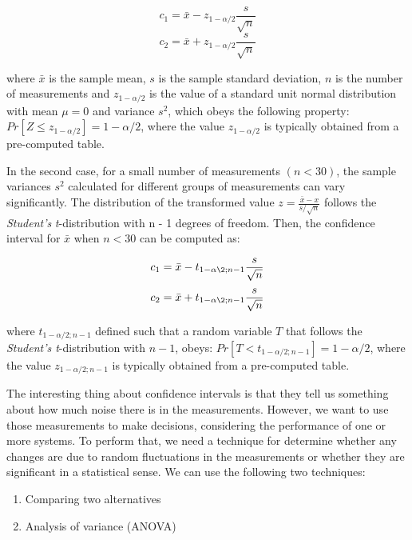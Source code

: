 \documentclass{latex/classes/thesis}
\begin{document}
\begin{equation}
c_1 = \bar{x} - z_{1 - \alpha/2}\frac{s}{\sqrt{n}}
\end{equation}
\begin{equation}
c_2 = \bar{x} + z_{1 - \alpha/2}\frac{s}{\sqrt{n}}
\end{equation}

where \(\bar{x}\) is the sample mean, \(s\) is the sample standard deviation,
\(n\) is the number of measurements and \(z_{1 - \alpha/2}\) is the value of
a standard unit normal distribution with mean \(\mu = 0\) and variance
\(s^2\), which obeys the following property: \(Pr[Z \le z_{1-\alpha/2}] =
   1 - \alpha/2\), where the value \(z_{1 - \alpha/2}\) is typically obtained
from a pre-computed table.

In the second case, for a small number of measurements \((n < 30)\), the
sample variances \(s^2\) calculated for different groups of measurements can
vary significantly. The distribution of the transformed value \(z =
   \frac{\bar{x} - x}{s/\sqrt{n}}\) follows the \emph{Student's} \emph{t}-distribution
with n - 1 degrees of freedom. Then, the confidence interval for \(\bar{x}\)
when \(n < 30\) can be computed as:

\begin{equation}
c_1 = \bar{x} - t_{1-\alpha\2;n-1}\frac{s}{\sqrt{n}}
\end{equation}
\begin{equation}
c_2 = \bar{x} + t_{1-\alpha\2;n-1}\frac{s}{\sqrt{n}}
\end{equation}

where \(t_{1 - \alpha/2;n-1}\) defined such that a random variable \(T\) that
follows the \emph{Student's t}-distribution with \(n - 1\), obeys: \(Pr[T < t_{1 -
   \alpha/2;n - 1}] = 1 - \alpha/2\), where the value \(z_{1 - \alpha/2;n - 1}\)
is typically obtained from a pre-computed table.

The interesting thing about confidence intervals is that they tell us
something about how much noise there is in the measurements. However, we want
to use those measurements to make decisions, considering the performance of
one or more systems. To perform that, we need a technique for determine
whether any changes are due to random fluctuations in the measurements or
whether they are significant in a statistical sense. We can use the following
two techniques:

\begin{enumerate}
\item Comparing two alternatives
\item Analysis of variance (ANOVA)
\end{enumerate}
\end{document}
